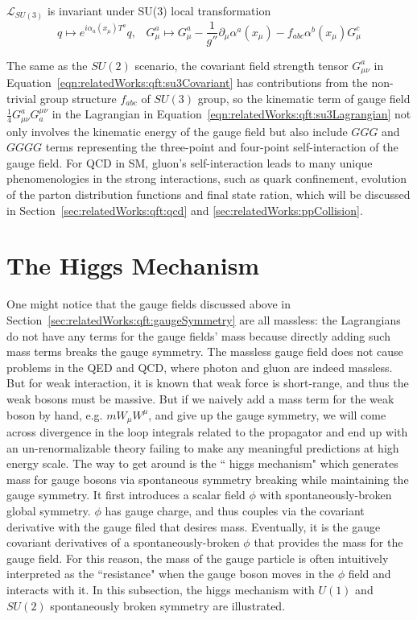 \noindent $\mathcal{L}_{SU(3)}$ is invariant under SU(3) local transformation 
\begin{equation}
	q \longmapsto  e^{i\alpha_a (x_\mu) T^a} q , \;\;\; 
    G^a_\mu \longmapsto  G^a_\mu - \frac{1}{g''}\partial_\mu \alpha^a(x_\mu) - f_{abc}\alpha^b(x_\mu) G^c_\mu 
\end{equation}



\noindent The same as the $SU(2)$  scenario, the covariant field strength tensor $G^a_{\mu\nu}$ in Equation~\ref{eqn:relatedWorks:qft:su3Covariant}  has contributions from the non-trivial group structure $f_{abc}$ of $SU(3)$ group, so the kinematic term of gauge field $\frac{1}{4}G^a_{\mu\nu}G^{\mu\nu}_a$ in the Lagrangian in Equation~\ref{eqn:relatedWorks:qft:su3Lagrangian} not only involves the kinematic energy of the gauge field but also include $GGG$ and $GGGG$ terms representing the three-point and four-point self-interaction of the gauge field. For QCD in SM, gluon's self-interaction leads to many unique phenomenologies in the strong interactions, such as quark confinement, evolution of the parton distribution functions and final state ration, which will be discussed in Section~\ref{sec:relatedWorks:qft:qcd} and \ref{sec:relatedWorks:ppCollision}.





\section{The Higgs Mechanism}
\label{sec:relatedWorks:qft:higgsMechanism}
One might notice that the gauge fields discussed above in Section~\ref{sec:relatedWorks:qft:gaugeSymmetry} are all massless: the Lagrangians do not have any terms for the gauge fields' mass because directly adding such mass terms breaks the gauge symmetry. The massless gauge field does not cause problems in the QED and QCD, where photon and gluon are indeed massless. But for weak interaction, it is known that weak force is short-range, and thus the weak bosons must be massive. But if we naively add a mass term for the weak boson by hand, e.g. $m W_\mu W^\mu$, and give up the gauge symmetry, we will come across divergence in the loop integrals related to the propagator and end up with an un-renormalizable theory failing to make any meaningful predictions at high energy scale. The way to get around is the `` higgs mechanism" which generates mass for gauge bosons via spontaneous symmetry breaking while maintaining the gauge symmetry. It first introduces a scalar field $\phi$ with spontaneously-broken global symmetry. $\phi$ has gauge charge, and thus couples via the covariant derivative with the gauge filed that desires mass. Eventually, it is the gauge covariant derivatives of a spontaneously-broken $\phi$ that provides the mass for the gauge field. For this reason, the mass of the gauge particle is often intuitively interpreted as the ``resistance" when the gauge boson moves in the $\phi$ field and interacts with it. In this subsection, the higgs mechanism with $U(1)$ and $SU(2)$ spontaneously broken symmetry are illustrated.

